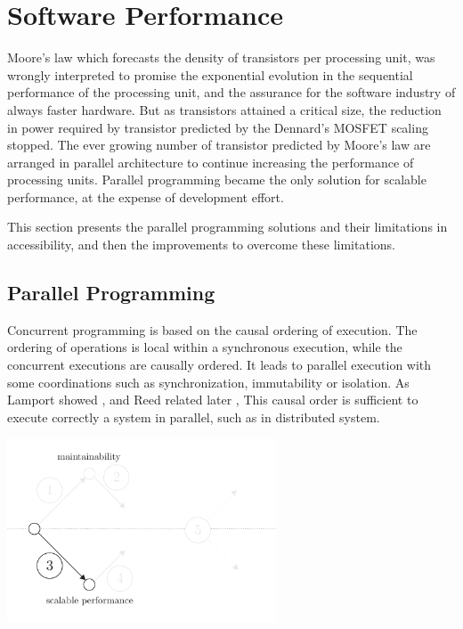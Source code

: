 \section{Software Performance} \label{chapter3:software-performance}



Moore's law \cite{Moore1965} which forecasts the density of transistors per processing unit, was wrongly interpreted to promise the exponential evolution in the sequential performance of the processing unit, and the assurance for the software industry of always faster hardware.
But as transistors attained a critical size, the reduction in power required by transistor predicted by the Dennard's MOSFET scaling \cite{Dennard2007} stopped.
The ever growing number of transistor predicted by Moore's law are arranged in parallel architecture to continue increasing the performance of processing units.
Parallel programming became the only solution for scalable performance, at the expense of development effort.

This section presents the parallel programming solutions and their limitations in accessibility, and then the improvements to overcome these limitations.

\subsection{Parallel Programming} \label{chapter3:software-performance:parallel-programming}


Concurrent programming is based on the causal ordering of execution.
The ordering of operations is local within a synchronous execution, while the concurrent executions are causally ordered.
It leads to parallel execution with some coordinations such as synchronization, immutability or isolation.
As Lamport showed \cite{Lamport1978}, and Reed related later \cite{Reed2012}, This causal order is sufficient to execute correctly a system in parallel, such as in distributed system.

\begin{center}
\includegraphics[width=0.6\textwidth]{../ressources/state-of-the-art-3.pdf}
\end{center}

